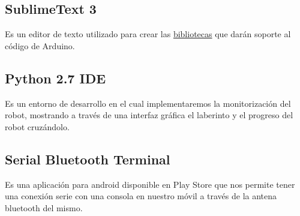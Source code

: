 \subsection{SublimeText 3}
Es un editor de texto utilizado para crear las \hyperlink{bibliotecas}{bibliotecas} que darán soporte al código de Arduino.
\subsection{Python 2.7 IDE}
Es un entorno de desarrollo en el cual implementaremos la monitorización del robot, mostrando a través de una interfaz gráfica el laberinto y el progreso del robot cruzándolo.
\subsection{Serial Bluetooth Terminal}
Es una aplicación para android disponible en Play Store que nos permite tener una conexión serie con una consola en nuestro móvil a través de la antena bluetooth del mismo.